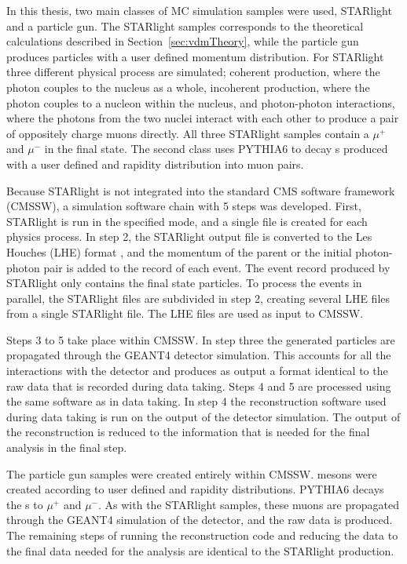     In this thesis, two main classes of MC simulation samples were used, 
      STARlight and a particle gun.
    The STARlight samples corresponds to the theoretical calculations 
      described in Section~\ref{sec:vdmTheory}, while the particle gun produces
      particles with a user defined momentum distribution. 
    For STARlight three different physical process are simulated;
      coherent \JPsi{} production, where the photon couples to the nucleus as
      a whole, incoherent \JPsi{} production, where the photon couples to a
      nucleon within the nucleus, and photon-photon interactions, where the 
      photons from the two nuclei interact with each other to produce a pair 
      of oppositely charge muons directly.
    All three STARlight samples contain a $\mu^{+}$ and $\mu^{-}$ in the final 
      state.
    The second class uses PYTHIA6 to decay \JPsi{}s produced with a user 
      defined \pt{} and rapidity distribution into muon pairs.

    Because STARlight is not integrated into the standard CMS software 
      framework (CMSSW), a simulation software chain with 5 steps was developed.
    First, STARlight is run in the specified mode, and a single file is 
      created for each physics process. 
    In step 2, the STARlight output file is converted to the Les Houches (LHE) 
      format \cite{lheFormat}, and the momentum of the parent \JPsi{} or the 
      initial photon-photon pair is added to the record of each event.
    The event record produced by STARlight only contains the final state 
      particles.
    To process the events in parallel, the STARlight files are subdivided 
      in step 2, creating several LHE files from a single STARlight file.
    The LHE files are used as input to CMSSW.

    Steps 3 to 5 take place within CMSSW. 
    In step three the generated particles are propagated through the GEANT4 
      \cite{geant} detector simulation.
    This accounts for all the interactions with the detector and produces as 
      output a format identical to the raw data that is recorded during data
      taking.
    Steps 4 and 5 are processed using the same software as in data taking.
    In step 4 the reconstruction software used during data taking is run on 
      the output of the detector simulation.
    The output of the reconstruction is reduced to the information that is 
      needed for the final analysis in the final step.

    The particle gun samples were created entirely within CMSSW.
    \JPsi{} mesons were created according to user defined \pt{} and rapidity
      distributions. 
    PYTHIA6 \cite{pythia} decays the \JPsi{}s to $\mu^{+}$ and $\mu^{-}$.
    As with the STARlight samples, these muons are propagated through the GEANT4
      simulation of the detector, and the raw data is produced.
    The remaining steps of running the reconstruction code and reducing the 
      data to the final data needed for the analysis are identical to the 
      STARlight production.

